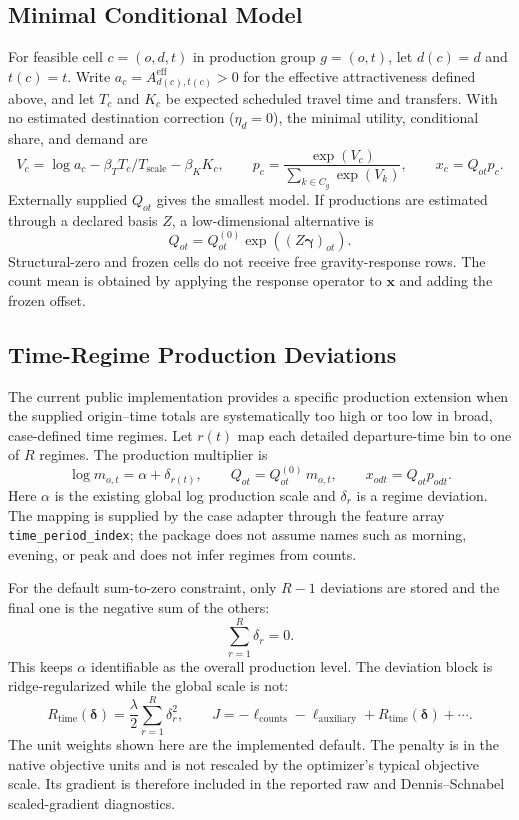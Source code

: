 \subsection{Minimal Conditional Model}

For feasible cell $c=(o,d,t)$ in production group $g=(o,t)$, let
$d(c)=d$ and $t(c)=t$.  Write $a_c=A^{\mathrm{eff}}_{d(c),t(c)}>0$ for the
effective attractiveness defined above, and let $T_c$ and $K_c$ be expected
scheduled travel time and transfers.  With no estimated destination correction
($\eta_d=0$), the minimal utility, conditional share, and demand are
\[
 V_c=\log a_c-\beta_T T_c/T_{\mathrm{scale}}-\beta_KK_c,
 \qquad
 p_c=\frac{\exp(V_c)}{\sum_{k\in C_g}\exp(V_k)},
 \qquad
 x_c=Q_{ot}p_c.
\]
Externally supplied $Q_{ot}$ gives the smallest model. If productions are
estimated through a declared basis $Z$, a low-dimensional alternative is
\[
 Q_{ot}=Q_{ot}^{(0)}\exp((Z\bm\gamma)_{ot}).
\]
Structural-zero and frozen cells do not receive free gravity-response rows.
The count mean is obtained by applying the response operator to $\bm x$ and
adding the frozen offset.

\subsection{Time-Regime Production Deviations}

The current public implementation provides a specific production extension
when the supplied origin--time totals are systematically too high or too low
in broad, case-defined time regimes.  Let $r(t)$ map each detailed
departure-time bin to one of $R$ regimes.  The production multiplier is
\[
    \log m_{o,t}=\alpha+\delta_{r(t)},
    \qquad
    Q_{ot}=Q^{(0)}_{ot}\,m_{o,t},
    \qquad
    x_{odt}=Q_{ot}p_{odt}.
\]
Here $\alpha$ is the existing global log production scale and $\delta_r$ is a
regime deviation.  The mapping is supplied by the case adapter through the
feature array \texttt{time\_period\_index}; the package does not assume names
such as morning, evening, or peak and does not infer regimes from counts.

For the default sum-to-zero constraint, only $R-1$ deviations are stored and
the final one is the negative sum of the others:
\[
    \sum_{r=1}^{R}\delta_r=0.
\]
This keeps $\alpha$ identifiable as the overall production level.  The
deviation block is ridge-regularized while the global scale is not:
\[
    R_{\mathrm{time}}(\bm\delta)
      =\frac{\lambda}{2}\sum_{r=1}^{R}\delta_r^2,
    \qquad
    J=-\ell_{\mathrm{counts}}-\ell_{\mathrm{auxiliary}}
      +R_{\mathrm{time}}(\bm\delta)+\cdots .
\]
The unit weights shown here are the implemented default.  The penalty is in
the native objective units and is not rescaled by the optimizer's typical
objective scale.  Its gradient is therefore included in the reported raw and
Dennis--Schnabel scaled-gradient diagnostics.

